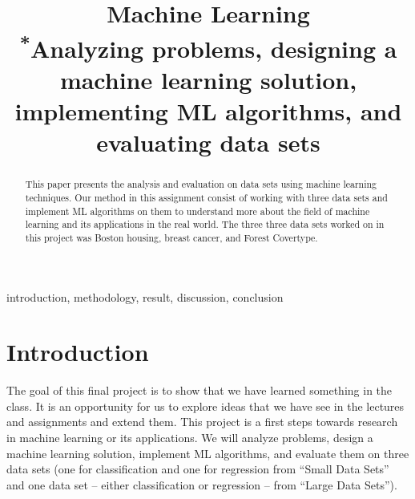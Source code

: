 \documentclass[conference]{IEEEtran}
\begin{document}
\title{Machine Learning\\
{\footnotesize \textsuperscript{*}Analyzing problems, designing a machine learning solution, implementing ML algorithms, and evaluating  data sets }
}

\author{
\and
{}
\and
{}
\and
{}
}

\maketitle


\begin{abstract}
This paper presents the analysis and evaluation on data sets using machine learning techniques. Our method in this assignment consist of working with three data sets and implement ML algorithms on them to understand more about the field of machine learning and its applications in the real world. The three three data sets worked on in this project was  Boston housing, breast cancer, and Forest Covertype.
\end{abstract}

\begin{IEEEkeywords}
introduction, methodology, result, discussion, conclusion
\end{IEEEkeywords}

\section{Introduction}
The goal of this final project is to show that we have learned something in the class. It is an opportunity for us to explore ideas that we have see in the lectures and assignments and extend them. This project is a first steps towards research in machine learning or its applications. We will analyze problems, design a machine learning solution, implement ML algorithms, and evaluate them on three data sets (one for classification and one for regression from “Small Data Sets” and one data set – either classification or regression – from “Large Data Sets”).
\end{document}
